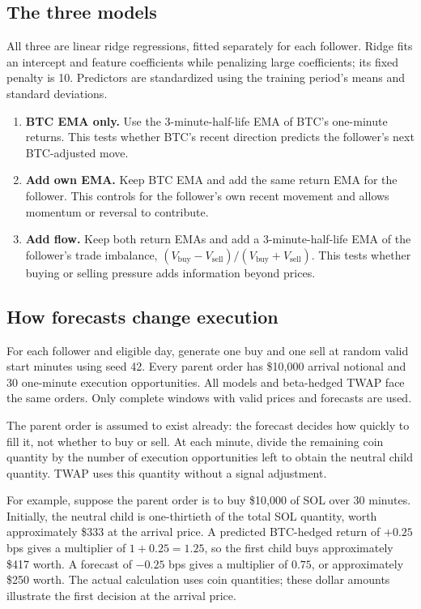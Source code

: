 \documentclass[11pt]{article}
\begin{document}
\subsection{The three models}
All three are linear ridge regressions, fitted separately for each follower. Ridge fits an intercept and feature coefficients while penalizing large coefficients; its fixed penalty is 10. Predictors are standardized using the training period's means and standard deviations.
\begin{enumerate}
\item \textbf{BTC EMA only.} Use the 3-minute-half-life EMA of BTC's one-minute returns. This tests whether BTC's recent direction predicts the follower's next BTC-adjusted move.
\item \textbf{Add own EMA.} Keep BTC EMA and add the same return EMA for the follower. This controls for the follower's own recent movement and allows momentum or reversal to contribute.
\item \textbf{Add flow.} Keep both return EMAs and add a 3-minute-half-life EMA of the follower's trade imbalance, $(V_{\mathrm{buy}}-V_{\mathrm{sell}})/(V_{\mathrm{buy}}+V_{\mathrm{sell}})$. This tests whether buying or selling pressure adds information beyond prices.
\end{enumerate}

\subsection{How forecasts change execution}
For each follower and eligible day, generate one buy and one sell at random valid start minutes using seed 42. Every parent order has \$10,000 arrival notional and 30 one-minute execution opportunities. All models and beta-hedged TWAP face the same orders. Only complete windows with valid prices and forecasts are used.

The parent order is assumed to exist already: the forecast decides how quickly to fill it, not whether to buy or sell. At each minute, divide the remaining coin quantity by the number of execution opportunities left to obtain the neutral child quantity. TWAP uses this quantity without a signal adjustment.

For example, suppose the parent order is to buy \$10,000 of SOL over 30 minutes. Initially, the neutral child is one-thirtieth of the total SOL quantity, worth approximately \$333 at the arrival price. A predicted BTC-hedged return of $+0.25$ bps gives a multiplier of $1+0.25=1.25$, so the first child buys approximately \$417 worth. A forecast of $-0.25$ bps gives a multiplier of $0.75$, or approximately \$250 worth. The actual calculation uses coin quantities; these dollar amounts illustrate the first decision at the arrival price.
\end{document}
